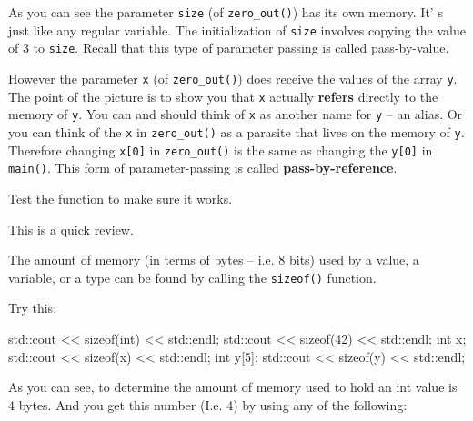As you can see the parameter \texttt{size} (of \texttt{zero\_out()}) has its own memory. It' s just like any regular variable. The initialization of \texttt{size} involves copying the value of 3 to \texttt{size}. Recall that this type of parameter passing is called pass-by-value.

However the parameter \texttt{x} (of \texttt{zero\_out()}) does  receive the values of the array \texttt{y}. The point of the picture is to show you that \texttt{x} actually \textbf{refers} directly to the memory of \texttt{y}. You can and should think of \texttt{x} as another name for \texttt{y} -- an alias. Or you can think of the \texttt{x} in \texttt{zero\_out()} as a parasite that lives on the memory of \texttt{y}. Therefore changing \texttt{x[0]} in \texttt{zero\_out()} is the same as changing the \texttt{y[0]} in \texttt{main()}. This form of parameter-passing is called \textbf{pass-by-reference}.

Test the function to make sure it works.





\newpage{}





\newpage{}

This is a quick review.

The amount of memory (in terms of bytes -- i.e. 8 bits) used by a value,
a variable, or a type can be found by calling the \texttt{sizeof()}
function.

Try this:

\begin{consolethree}[escapeinside=||]
std::cout << sizeof(int) << std::endl;
std::cout << sizeof(42) << std::endl;
int x;
std::cout << sizeof(x) << std::endl;
int y[5];
std::cout << sizeof(y) << std::endl;
\end{consolethree}

As you can see, to determine the amount of memory used to hold an int
value is 4 bytes. And you get this number (I.e. 4) by using any of the
following:

